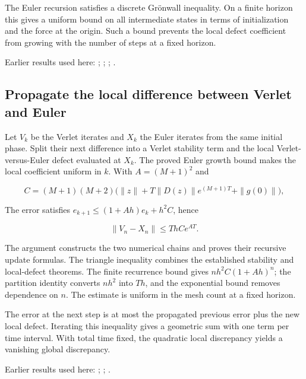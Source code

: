 \documentclass[11pt,a4paper]{report}
\begin{document}
The Euler recursion satisfies a discrete Grönwall inequality. On a finite horizon this gives a uniform bound on all intermediate states in terms of initialization and the force at the origin. Such a bound prevents the local defect coefficient from growing with the number of steps at a fixed horizon.



Earlier results used here: \cite[Section~3.16.1]{LangevinLean2026ULASC}; \cite[Section~3.16.3]{LangevinLean2026ULASC}; \cite[Section~3.16.5]{LangevinLean2026ULASC}; \cite[Section~3.16.6]{LangevinLean2026ULASC}.
\subsection{\texorpdfstring{Propagate the local difference between Verlet and Euler}{Propagate the local difference between Verlet and Euler}}
\label{report-step-KineticLangevin-HamiltonianConvergence-lean-4}


Let \(V_k\) be the Verlet iterates and \(X_k\) the Euler iterates from the same initial phase. Split their next difference into a Verlet stability term and the local Verlet-versus-Euler defect evaluated at \(X_k\). The proved Euler growth bound makes the local coefficient uniform in \(k\). With \(A=(M+1)^2\) and

\[C=(M+1)(M+2)\bigl(\|z\|+T\|D(z)\|e^{(M+1)T}+\|g(0)\|\bigr),\]

The error satisfies \(e_{k+1}\le(1+Ah)e_k+h^2C\), hence

\[\|V_n-X_n\|\le ThC e^{AT}.\]

The argument constructs the two numerical chains and proves their recursive update formulas. The triangle inequality combines the established stability and local-defect theorems. The finite recurrence bound gives \(nh^2C(1+Ah)^n\); the partition identity converts \(nh^2\) into \(Th\), and the exponential bound removes dependence on \(n\). The estimate is uniform in the mesh count at a fixed horizon.



The error at the next step is at most the propagated previous error plus the new local defect. Iterating this inequality gives a geometric sum with one term per time interval. With total time fixed, the quadratic local discrepancy yields a vanishing global discrepancy.



Earlier results used here: \cite[Section~3.16.1]{LangevinLean2026ULASC}; \cite[Section~3.16.3]{LangevinLean2026ULASC}; \cite[Section~3.16.5]{LangevinLean2026ULASC}.
\end{document}
